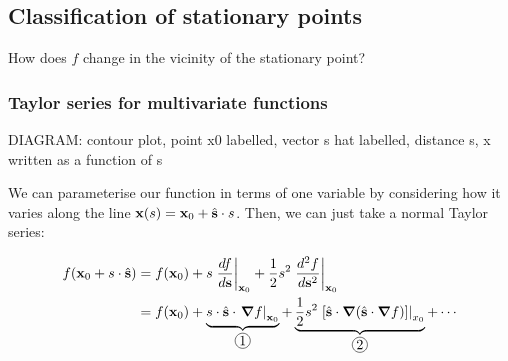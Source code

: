 \documentclass{../../template/note}
\begin{document}
    \subsection{Classification of stationary points}

    How does \(f\) change in the vicinity of the stationary point?

    \subsubsection{Taylor series for multivariate functions}

    DIAGRAM: contour plot, point x0 labelled, vector s hat labelled, distance s, x written as a function of s

    We can parameterise our function in terms of one variable by considering how it varies along the line \(\vec x(s) = \vec x_0 + \hvec s \cdot s\). Then, we can just take a normal Taylor series:

    \begin{align*}
        f(\vec x_0 + s \cdot \hvec s) &= f(\vec x_0) + s\left.\frac{df}{d \vec s}\right|_{\vec x_0} + \frac{1}{2}s^2 \left.\frac{d^2f}{d\vec s^2}\right|_{\vec x_0} \\
        &= f(\vec x_0) + \underbrace{s \cdot \hvec s \cdot \left.\grad f\right|_{\vec x_0}}_{\circled 1} + \underbrace{\frac{1}{2}s^2 \left.[\hvec s \cdot \grad(\hvec s \cdot \grad f)]\right|_{x_0}}_{\circled 2} + \cdots
    \end{align*}
    
\end{document}

